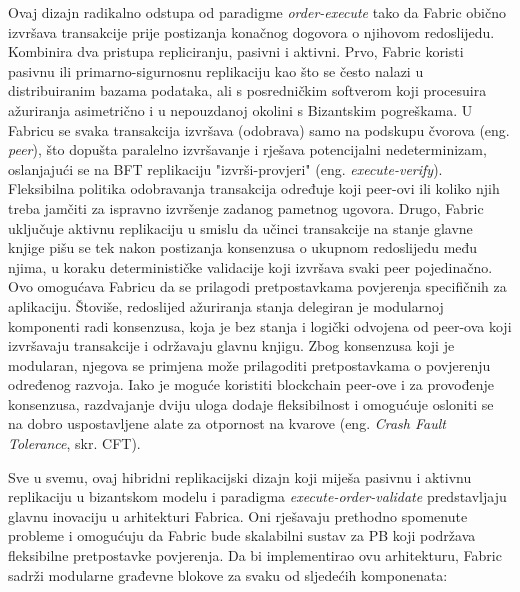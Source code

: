 \documentclass[times, utf8, diplomski]{fer}
\begin{document}
Ovaj dizajn radikalno odstupa od paradigme \textit{order-execute} tako da Fabric obično izvršava transakcije prije postizanja konačnog dogovora o njihovom redoslijedu. Kombinira dva pristupa repliciranju, pasivni i aktivni.
Prvo, Fabric koristi pasivnu ili primarno-sigurnosnu replikaciju kao što se često nalazi u distribuiranim bazama podataka, ali s posredničkim softverom koji procesuira ažuriranja asimetrično i u nepouzdanoj okolini s Bizantskim pogreškama. U Fabricu se svaka transakcija izvršava (odobrava) samo na podskupu čvorova (eng.  \textit{peer}), što dopušta paralelno izvršavanje i rješava potencijalni nedeterminizam, oslanjajući se na BFT replikaciju "izvrši-provjeri" (eng. \textit{execute-verify}). Fleksibilna politika odobravanja transakcija određuje koji peer-ovi ili koliko njih treba jamčiti za ispravno izvršenje zadanog pametnog ugovora.
Drugo, Fabric uključuje aktivnu replikaciju u smislu da učinci transakcije na stanje glavne knjige pišu se tek nakon postizanja konsenzusa o ukupnom redoslijedu među njima, u koraku determinističke validacije koji izvršava svaki peer pojedinačno. Ovo omogućava Fabricu da se prilagodi pretpostavkama povjerenja specifičnih za aplikaciju.
Štoviše,  redoslijed ažuriranja stanja delegiran je modularnoj komponenti radi konsenzusa, koja je bez stanja i logički odvojena od peer-ova koji izvršavaju transakcije i održavaju glavnu knjigu. Zbog konsenzusa koji je modularan, njegova se primjena može prilagoditi pretpostavkama o povjerenju određenog razvoja. Iako je moguće koristiti blockchain peer-ove i za provođenje konsenzusa, razdvajanje dviju uloga dodaje fleksibilnost i omogućuje osloniti se na dobro uspostavljene alate za otpornost na kvarove (eng. \textit{Crash Fault Tolerance}, skr. CFT). \cite{Fabric}

Sve u svemu, ovaj hibridni replikacijski dizajn koji miješa pasivnu i aktivnu replikaciju u bizantskom modelu i paradigma \textit{execute-order-validate} predstavljaju glavnu inovaciju u arhitekturi Fabrica. Oni rješavaju prethodno spomenute probleme i omogućuju da Fabric bude skalabilni sustav za PB koji podržava fleksibilne pretpostavke povjerenja. Da bi implementirao ovu arhitekturu, Fabric sadrži modularne građevne blokove za svaku od sljedećih komponenata:
\end{document}
